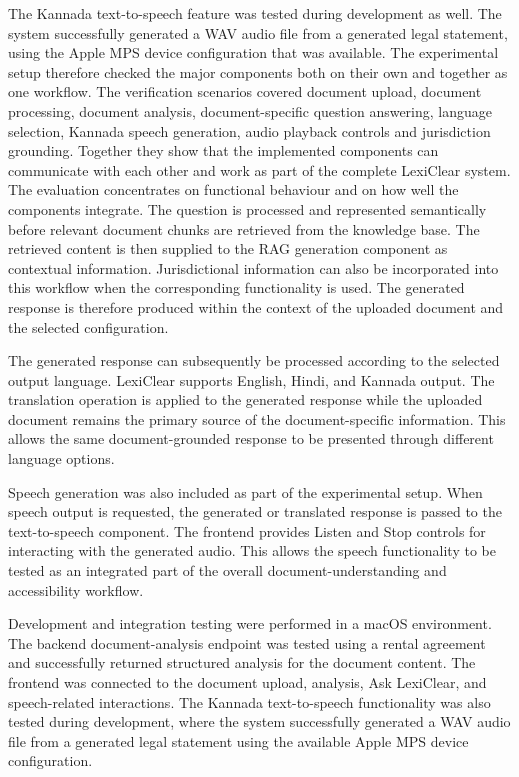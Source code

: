 \documentclass[12pt,a4paper,oneside]{report}
\begin{document}
The Kannada text-to-speech feature was tested during development as well. The system successfully generated a WAV audio file from a generated legal statement, using the Apple MPS device configuration that was available. The experimental setup therefore checked the major components both on their own and together as one workflow. The verification scenarios covered document upload, document processing, document analysis, document-specific question answering, language selection, Kannada speech generation, audio playback controls and jurisdiction grounding. Together they show that the implemented components can communicate with each other and work as part of the complete LexiClear system. The evaluation concentrates on functional behaviour and on how well the components integrate. The question is processed and represented
semantically before relevant document chunks are retrieved from the
knowledge base. The retrieved content is then supplied to the RAG generation
component as contextual information. Jurisdictional information can also be
incorporated into this workflow when the corresponding functionality is used.
The generated response is therefore produced within the context of the
uploaded document and the selected configuration.

The generated response can subsequently be processed according to the
selected output language. LexiClear supports English, Hindi, and Kannada
output. The translation operation is applied to the generated response while
the uploaded document remains the primary source of the document-specific
information. This allows the same document-grounded response to be presented
through different language options.

Speech generation was also included as part of the experimental setup. When
speech output is requested, the generated or translated response is passed to
the text-to-speech component. The frontend provides Listen and Stop controls
for interacting with the generated audio. This allows the speech functionality
to be tested as an integrated part of the overall document-understanding and
accessibility workflow.

Development and integration testing were performed in a macOS environment.
The backend document-analysis endpoint was tested using a rental agreement and
successfully returned structured analysis for the document content. The
frontend was connected to the document upload, analysis, Ask LexiClear, and
speech-related interactions. The Kannada text-to-speech functionality was
also tested during development, where the system successfully generated a WAV
audio file from a generated legal statement using the available Apple MPS
device configuration.
\end{document}
